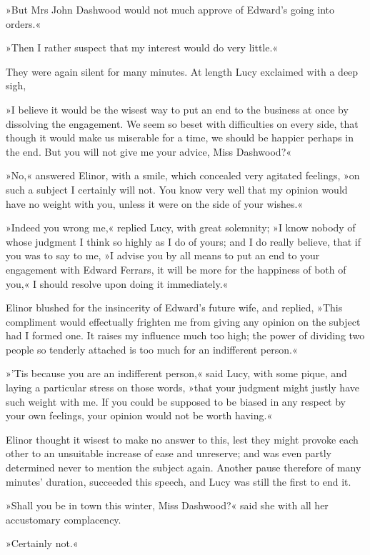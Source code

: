 »But Mrs John Dashwood would not much approve of Edward’s going into orders.«

»Then I rather suspect that my interest would do very little.«

They were again silent for many minutes. At length Lucy exclaimed with a deep sigh,

»I believe it would be the wisest way to put an end to the business at once by dissolving the engagement. We seem so beset with difficulties on every side, that though it would make us miserable for a time, we should be happier perhaps in the end. But you will not give me your advice, Miss Dashwood?«

»No,« answered Elinor, with a smile, which concealed very agitated feelings, »on such a subject I certainly will not. You know very well that my opinion would have no weight with you, unless it were on the side of your wishes.«

»Indeed you wrong me,« replied Lucy, with great solemnity; »I know nobody of whose judgment I think so highly as I do of yours; and I do really believe, that if you was to say to me, »I advise you by all means to put an end to your engagement with Edward Ferrars, it will be more for the happiness of both of you,« I should resolve upon doing it immediately.«

Elinor blushed for the insincerity of Edward’s future wife, and replied, »This compliment would effectually frighten me from giving any opinion on the subject had I formed one. It raises my influence much too high; the power of dividing two people so tenderly attached is too much for an indifferent person.«

»’Tis because you are an indifferent person,« said Lucy, with some pique, and laying a particular stress on those words, »that your judgment might justly have such weight with me. If you could be supposed to be biased in any respect by your own feelings, your opinion would not be worth having.«

Elinor thought it wisest to make no answer to this, lest they might provoke each other to an unsuitable increase of ease and unreserve; and was even partly determined never to mention the subject again. Another pause therefore of many minutes’ duration, succeeded this speech, and Lucy was still the first to end it.

»Shall you be in town this winter, Miss Dashwood?« said she with all her accustomary complacency.

»Certainly not.«

